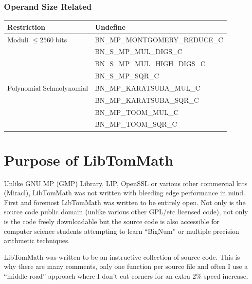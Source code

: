 \documentclass[synpaper]{book}
\begin{document}
\subsubsection{Operand Size Related}
\begin{small}
\begin{center}
\begin{tabular}{|l|l|}
\hline \textbf{Restriction} & \textbf{Undefine} \\
\hline Moduli $\le 2560$ bits              & BN\_MP\_MONTGOMERY\_REDUCE\_C \\
                                           & BN\_S\_MP\_MUL\_DIGS\_C \\
                                           & BN\_S\_MP\_MUL\_HIGH\_DIGS\_C \\
                                           & BN\_S\_MP\_SQR\_C \\
\hline Polynomial Schmolynomial            & BN\_MP\_KARATSUBA\_MUL\_C \\
                                           & BN\_MP\_KARATSUBA\_SQR\_C \\
                                           & BN\_MP\_TOOM\_MUL\_C \\ 
                                           & BN\_MP\_TOOM\_SQR\_C \\

\hline
\end{tabular}
\end{center}
\end{small}


\section{Purpose of LibTomMath}
Unlike  GNU MP (GMP) Library, LIP, OpenSSL or various other commercial kits (Miracl), LibTomMath was not written with 
bleeding edge performance in mind.  First and foremost LibTomMath was written to be entirely open.  Not only is the 
source code public domain (unlike various other GPL/etc licensed code), not only is the code freely downloadable but the
source code is also accessible for computer science students attempting to learn ``BigNum'' or multiple precision
arithmetic techniques. 

LibTomMath was written to be an instructive collection of source code.  This is why there are many comments, only one
function per source file and often I use a ``middle-road'' approach where I don't cut corners for an extra 2\% speed
increase.
\end{document}
